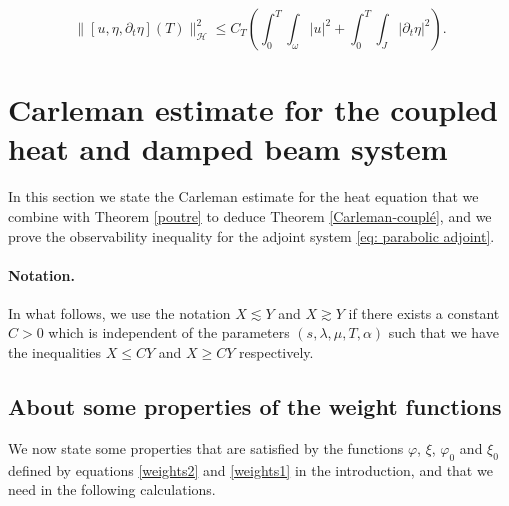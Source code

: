 \documentclass[a4paper, 12pt]{article}
\theoremstyle{plain}
\theoremstyle{definition}
\numberwithin{theorem}{section}
\numberwithin{equation}{section}
\begin{document}
{\begin{equation}\label{obs-form-simple}
    \|[u,\eta,\partial_t\eta](T)\|^2_{\mathscr{H}}\leq C_T\left(\int_0^T\int_\omega |u|^2+\int_0^T\int_J|\partial_t\eta |^2\right).
\end{equation}



\section{Carleman estimate for the coupled heat and damped beam system}\label{SectCarlemanEst}
In this section we state the Carleman estimate for the heat equation that we combine with Theorem \ref{poutre} to deduce Theorem \ref{Carleman-couplé}, and we prove the observability inequality for the adjoint system \eqref{eq: parabolic adjoint}.

\paragraph{Notation.}
In what follows, we use the notation $X\lesssim Y$ and $X\gtrsim Y$ if there exists a constant $C>0$ which is independent of
the parameters $(s,\lambda,\mu,T,\alpha)$ such that we have the inequalities $X\leq C Y$ and $X\geq C Y$ respectively.

\subsection{About some properties of the weight functions}\label{weight-function-for-Carleman}

We now state some properties that are satisfied by the functions  $\varphi$, $\xi$, $\varphi_0$ and $\xi_0$
defined by equations \eqref{weights2} and \eqref{weights1} in the introduction, and that we need in the following calculations.

}
\end{document}

